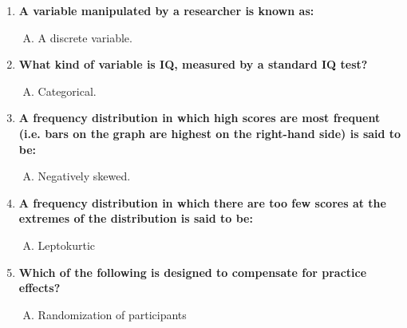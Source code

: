 \documentclass{article}[14pt]
\begin{document}
\begin{enumerate}[1.]
 \item %
  {\bf A variable manipulated by a researcher is known as:}
 \begin{enumerate}[C.]
 \item 
  A discrete variable.
\end{enumerate}
 \item %
  {\bf  What kind of variable is IQ, measured by a standard IQ test?}
 \begin{enumerate}[A.]
 \item 
  Categorical.
\end{enumerate}
 \item %
  {\bf  A frequency distribution in which high scores are most frequent (i.e. bars on the graph are highest on the right-hand side) is said to be:}
 \begin{enumerate}[D.]
 \item 
   Negatively skewed.
\end{enumerate}

 \item %
   {\bf A frequency distribution in which there are too few scores at the extremes of the distribution is said to be:  }
 \begin{enumerate}[B.]
 \item 
   Leptokurtic
\end{enumerate}
 \item %
    {\bf  Which of the following is designed to compensate for practice effects?}
 \begin{enumerate}[B.]
 \item 
   Randomization of participants
\end{enumerate}

\end{enumerate}
\end{document}

